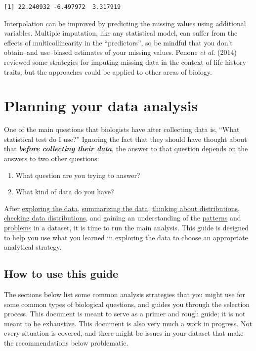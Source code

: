\documentclass[
  13,
  letterpaper,
]{report}
\providecommand{\tightlist}{%
  \setlength{\itemsep}{0pt}\setlength{\parskip}{0pt}}
\begin{document}
\begin{verbatim}
[1] 22.240932 -6.497972  3.317919
\end{verbatim}

Interpolation can be improved by predicting the missing values using
additional variables. Multiple imputation, like any statistical model,
can suffer from the effects of multicollinearity in the ``predictors'',
so be mindful that you don't obtain--and use--biased estimates of your
missing values. Penone \emph{et al.} (2014) reviewed some strategies for
imputing missing data in the context of life history traits, but the
approaches could be applied to other areas of biology.

\chapter{Planning your data analysis}\label{sec-plan}

One of the main questions that biologists have after collecting data is,
``What statistical test do I use?'' Ignoring the fact that they should
have thought about that \textbf{\emph{before collecting their data}},
the answer to that question depends on the answers to two other
questions:

\begin{enumerate}
\def\labelenumi{\arabic{enumi}.}
\tightlist
\item
  What question are you trying to answer?
\item
  What kind of data do you have?
\end{enumerate}

After \href{@sec-desc}{exploring the data}, \href{@sec-summ}{summarizing
the data}, \href{@sec-dist}{thinking about distributions},
\href{@sec-dtest}{checking data distributions}, and gaining an
understanding of the \href{@sec-plot1}{patterns} and
\href{@sec-problem}{problems} in a dataset, it is time to run the main
analysis. This guide is designed to help you use what you learned in
exploring the data to choose an appropriate analytical strategy.

\section{How to use this guide}\label{sec-plan-how}

The sections below list some common analysis strategies that you might
use for some common types of biological questions, and guides you
through the selection process. This document is meant to serve as a
primer and rough guide; it is not meant to be exhaustive. This document
is also very much a work in progress. Not every situation is covered,
and there might be issues in your dataset that make the recommendations
below problematic.
\end{document}
